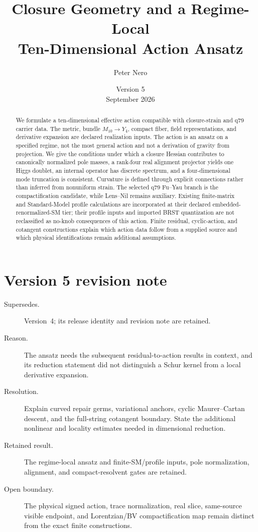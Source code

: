 \documentclass[11pt]{article}
\title{Closure Geometry and a Regime-Local\\
Ten-Dimensional Action Ansatz}
\author{Peter Nero}
\date{Version 5\\September 2026}
\begin{document}
\maketitle

\begin{abstract}
We formulate a ten-dimensional effective action compatible with closure-strain
and q79 carrier data.  The metric, bundle $M_{10}\to Y_4$, compact fiber,
field representations, and derivative expansion are declared realization
inputs.  The action is an ansatz on a specified regime, not the most general
action and not a derivation of gravity from projection.  We give the conditions
under which a closure Hessian contributes to canonically normalized pole
masses, a rank-four real alignment projector yields one Higgs doublet, an internal
operator has discrete spectrum, and a four-dimensional mode truncation is
consistent.  Curvature is defined through explicit connections rather than
inferred from nonuniform strain.  The selected q79 Fu--Yau branch is the
compactification candidate, while Lens--Nil remains auxiliary.  Existing
finite-matrix and Standard-Model profile calculations are incorporated at
their declared embedded-renormalized-SM tier; their profile inputs and imported
BRST quantization are not reclassified as no-knob consequences of this action.
Finite residual, cyclic-action, and cotangent constructions explain which
action data follow from a supplied source and which physical identifications
remain additional assumptions.
\end{abstract}

\section*{Version 5 revision note}
\begin{description}
\item[Supersedes.] Version~4; its release identity and revision note are retained.
\item[Reason.] The ansatz needs the subsequent residual-to-action results in
context, and its reduction statement did not distinguish a Schur kernel from
a local derivative expansion.
\item[Resolution.] Explain curved repair germs, variational anchors, cyclic
Maurer--Cartan descent, and the full-string cotangent boundary. State the
additional nonlinear and locality estimates needed in dimensional reduction.
\item[Retained result.] The regime-local ansatz and finite-SM/profile inputs,
pole normalization, alignment, and compact-resolvent gates are retained.
\item[Open boundary.] The physical signed action, trace normalization, real
slice, same-source visible endpoint, and Lorentzian/BV compactification map
remain distinct from the exact finite constructions.
\end{description}
\end{document}
